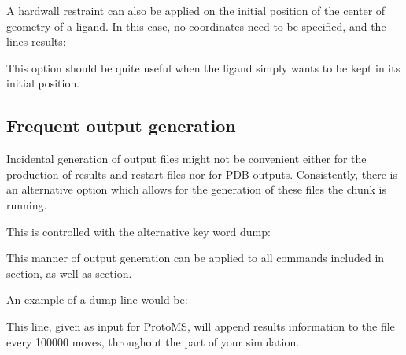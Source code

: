 \documentclass[letterpaper,10pt,english]{sphinxmanual}
\begin{document}
A hardwall restraint can also be applied on the initial position of the center of geometry of a ligand. In this case, no coordinates need to be specified, and the lines results:

%
\begin{sphinxVerbatim}[commandchars=\\\{\}]
    
\end{sphinxVerbatim}

This option should be quite useful when the ligand simply wants to be kept in its initial position.


\subsection{Frequent output generation}
\label{\detokenize{protoms:frequent-output-generation}}
Incidental generation of output files might not be convenient either for the production of results and restart files nor for PDB outputs. Consistently, there is an alternative option which allows for the generation of these files  the  chunk is running.

\ignorespaces 
This is controlled with the alternative key word dump:

%
\begin{sphinxVerbatim}[commandchars=\\\{\}]
  
\end{sphinxVerbatim}

This manner of output generation can be applied to all commands included in {\hyperref[\detokenize{protoms:results-and-restarts}]{}} section, as well as {\hyperref[\detokenize{protoms:pdb-output}]{}} section.

An example of a dump line would be:

%
\begin{sphinxVerbatim}[commandchars=\\\{\}]
    
\end{sphinxVerbatim}

This line, given as input for ProtoMS, will append results information to the  file every 100000 moves, throughout the  part of your simulation.
\end{document}
